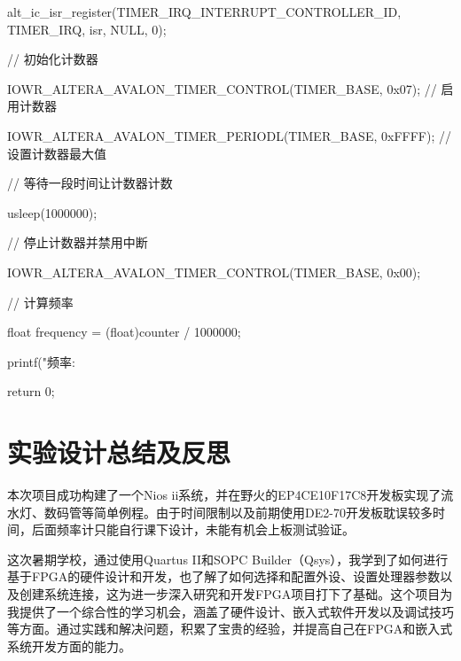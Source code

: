 \documentclass[AutoFakeBold]{LZUThesis}
\begin{document}
{

    alt\_ic\_isr\_register(TIMER\_IRQ\_INTERRUPT\_CONTROLLER\_ID, TIMER\_IRQ, isr, NULL, 0);  

    // 初始化计数器

IOWR\_ALTERA\_AVALON\_TIMER\_CONTROL(TIMER\_BASE, 0x07); // 启用计数器

IOWR\_ALTERA\_AVALON\_TIMER\_PERIODL(TIMER\_BASE, 0xFFFF);  // 设置计数器最大值

    // 等待一段时间让计数器计数

    usleep(1000000);
    
    // 停止计数器并禁用中断

    IOWR\_ALTERA\_AVALON\_TIMER\_CONTROL(TIMER\_BASE, 0x00);

    // 计算频率

    float frequency = (float)counter / 1000000; 

    printf("频率: %

    return 0;

}

\chapter{实验设计总结及反思}
本次项目成功构建了一个Nios ii系统，并在野火的EP4CE10F17C8开发板实现了流水灯、数码管等简单例程。由于时间限制以及前期使用DE2-70开发板耽误较多时间，后面频率计只能自行课下设计，未能有机会上板测试验证。

这次暑期学校，通过使用Quartus II和SOPC Builder（Qsys），我学到了如何进行基于FPGA的硬件设计和开发，也了解了如何选择和配置外设、设置处理器参数以及创建系统连接，这为进一步深入研究和开发FPGA项目打下了基础。这个项目为我提供了一个综合性的学习机会，涵盖了硬件设计、嵌入式软件开发以及调试技巧等方面。通过实践和解决问题，积累了宝贵的经验，并提高自己在FPGA和嵌入式系统开发方面的能力。
\varsigma 
\backmatter


\printbib
\nocite{*} %




\end{document}
